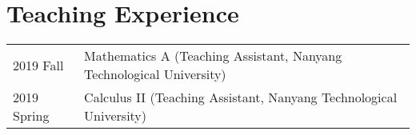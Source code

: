 \section*{Teaching Experience}
\begin{tabular}{p{} p{}}
2019 Fall & Mathematics A (Teaching Assistant, Nanyang Technological University) \\
2019 Spring & Calculus II (Teaching Assistant, Nanyang Technological University)
\end{tabular}
